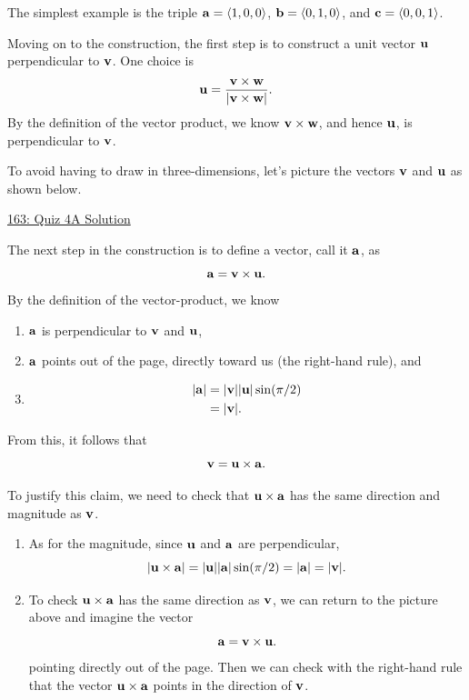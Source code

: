 \documentclass{ximera}
\begin{document}
\begin{question}
\begin{explanation}
The simplest example is the triple ${\bf a} = \langle 1, 0, 0 \rangle$, ${\bf b} = \langle 0,1,0 \rangle$, and ${\bf c} = \langle 0,0,1\rangle$.

Moving on to the construction, the first step is to construct a unit vector ${\bf u}$ perpendicular to ${\bf v}$. One choice is
\[
      {\bf u} =  \frac{{\bf v} \times {\bf w}}{\left| {\bf v} \times {\bf w}\right|} .
\]
By the definition of the vector product, we know ${\bf v}\times {\bf w}$, and hence ${\bf u}$, is perpendicular to ${\bf v}$.

To avoid having to draw in three-dimensions, let's picture the vectors ${\bf v}$ and ${\bf u}$ as shown below.

\begin{onlineOnly}
    \begin{center}
\end{center}
\end{onlineOnly}

\href{https://www.desmos.com/calculator/89y8r8q2ut}{163: Quiz 4A Solution}

The next step in the construction is to define a vector, call it ${\bf a}$, as
\[
 {\bf a} = {\bf v} \times {\bf u}.
\]
 By the definition of the vector-product, we know 
\begin{enumerate}
\item ${\bf a}$ is perpendicular to ${\bf v}$ and ${\bf u}$,

\item ${\bf a}$ points out of the page, directly toward us (the right-hand rule), and

\item 
\begin{align*}
   |{\bf a}|  &= |{\bf v} | |{\bf u} | \sin(\pi/2) \\
                 &= |{\bf v}| .
\end{align*}
\end{enumerate}

From this, it follows that 
\[
  {\bf v} = {\bf u}\times {\bf a} .
\]

To justify this claim, we need to check that ${\bf u}\times {\bf a}$ has the same direction and magnitude as ${\bf v}$.

\begin{enumerate}
\item As for the magnitude, since ${\bf u}$ and ${\bf a}$ are perpendicular,
\[
       | {\bf u}\times {\bf a} |  = |  {\bf u}  | | {\bf a}  | \sin (\pi/2) = | {\bf a}| =  |{\bf v}| .
\]

\item To check ${\bf u}\times {\bf a}$ has the same direction as ${\bf v}$, we can return to the picture above and imagine the vector
\[
 {\bf a} = {\bf v} \times {\bf u}.
\]
pointing directly out of the page. Then we can check with the right-hand rule that the vector ${\bf u}\times {\bf a}$ points in the direction of ${\bf v}$.

\end{enumerate}

\end{explanation}
\end{question}
\end{document}
